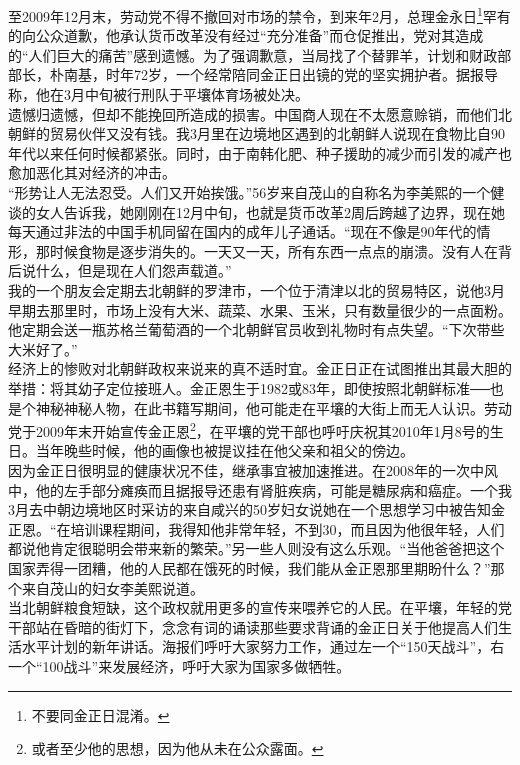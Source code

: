 \begin{multicols}{\theparacolNo}
至2009年12月末，劳动党不得不撤回对市场的禁令，到来年2月，总理金永日\footnote{不要同金正日混淆。}罕有的向公众道歉，他承认货币改革没有经过“充分准备”而仓促推出，党对其造成的“人们巨大的痛苦”感到遗憾。为了强调歉意，当局找了个替罪羊，计划和财政部部长，朴南基，时年72岁，一个经常陪同金正日出镜的党的坚实拥护者。据报导称，他在3月中旬被行刑队于平壤体育场被处决。\\

遗憾归遗憾，但却不能挽回所造成的损害。中国商人现在不太愿意赊销，而他们北朝鲜的贸易伙伴又没有钱。我3月里在边境地区遇到的北朝鲜人说现在食物比自90年代以来任何时候都紧张。同时，由于南韩化肥、种子援助的减少而引发的减产也愈加恶化其对经济的冲击。\\

“形势让人无法忍受。人们又开始挨饿。”56岁来自茂山的自称名为李美熙的一个健谈的女人告诉我，她刚刚在12月中旬，也就是货币改革2周后跨越了边界，现在她每天通过非法的中国手机同留在国内的成年儿子通话。“现在不像是90年代的情形，那时候食物是逐步消失的。一天又一天，所有东西一点点的崩溃。没有人在背后说什么，但是现在人们怨声载道。”\\

我的一个朋友会定期去北朝鲜的罗津市，一个位于清津以北的贸易特区，说他3月早期去那里时，市场上没有大米、蔬菜、水果、玉米，只有数量很少的一点面粉。他定期会送一瓶苏格兰葡萄酒的一个北朝鲜官员收到礼物时有点失望。“下次带些大米好了。”\\

经济上的惨败对北朝鲜政权来说来的真不适时宜。金正日正在试图推出其最大胆的举措：将其幼子定位接班人。金正恩生于1982或83年，即使按照北朝鲜标准──也是个神秘神秘人物，在此书籍写期间，他可能走在平壤的大街上而无人认识。劳动党于2009年末开始宣传金正恩\footnote{或者至少他的思想，因为他从未在公众露面。}，在平壤的党干部也呼吁庆祝其2010年1月8号的生日。当年晚些时候，他的画像也被提议挂在他父亲和祖父的傍边。\\

因为金正日很明显的健康状况不佳，继承事宜被加速推进。在2008年的一次中风中，他的左手部分瘫痪而且据报导还患有肾脏疾病，可能是糖尿病和癌症。一个我3月去中朝边境地区时采访的来自咸兴的50岁妇女说她在一个思想学习中被告知金正恩。“在培训课程期间，我得知他非常年轻，不到30，而且因为他很年轻，人们都说他肯定很聪明会带来新的繁荣。”另一些人则没有这么乐观。“当他爸爸把这个国家弄得一团糟，他的人民都在饿死的时候，我们能从金正恩那里期盼什么？”那个来自茂山的妇女李美熙说道。\\

当北朝鲜粮食短缺，这个政权就用更多的宣传来喂养它的人民。在平壤，年轻的党干部站在昏暗的街灯下，念念有词的诵读那些要求背诵的金正日关于他提高人们生活水平计划的新年讲话。海报们呼吁大家努力工作，通过左一个“150天战斗”，右一个“100战斗”来发展经济，呼吁大家为国家多做牺牲。\\


\end{multicols}
